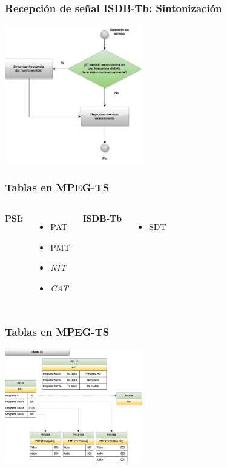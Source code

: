 \documentclass[a4paper,11pt]{beamer}
\begin{document}
			\begin{frame}
				\frametitle{Recepción de señal ISDB-Tb: Sintonización}
				\begin{center}
					\includegraphics[width=6cm]{proceso_seleccion.png}
				\end{center}
			\end{frame}

			\begin{frame}
				\frametitle{Tablas en MPEG-TS}
				\begin{columns}[t] %
					\textbf{PSI:}\\
					\begin{itemize}
						\item PAT
						\item PMT
						\item \emph{NIT}
						\item \emph{CAT}
					\end{itemize}
					\textbf{ISDB-Tb}
					\begin{itemize}
						\item SDT
					\end{itemize}
			\end{columns}
			\end{frame}

			\begin{frame}
				\frametitle{Tablas en MPEG-TS}
					\begin{center}
						\includegraphics[width=6cm]{canal_23_tables.png}
					\end{center}
			\end{frame}
\end{document}
